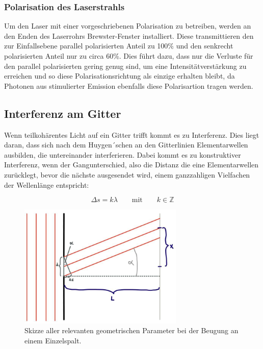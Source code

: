         \subsubsection{Polarisation des Laserstrahls}
            Um den Laser mit einer vorgeschriebenen Polarisation zu betreiben, werden an den Enden des Laserrohrs Brewster-Fenster installiert. Diese transmittieren den zur Einfallsebene parallel polarisierten
            Anteil zu 100\% und den senkrecht polarisierten Anteil nur zu circa 60\%. Dies führt dazu, dass nur die Verluste für den parallel polarisierten gering genug sind, um eine Intensitätverstärkung zu 
            erreichen und so diese Polarisationsrichtung als einzige erhalten bleibt, da Photonen aus stimulierter Emission ebenfalls diese Polarisartion tragen werden.  


    \subsection{Interferenz am Gitter}
        Wenn teilkohärentes Licht auf ein Gitter trifft kommt es zu Interferenz. Dies liegt daran, dass sich nach dem Huygen´schen an den Gitterlinien Elementarwellen ausbilden, die untereinander interferieren.
        Dabei kommt es zu konstruktiver Interferenz, wenn der Gangunterschied, also die Distanz die eine Elementarwellen zurücklegt, bevor die nächste ausgesendet wird, einem ganzzahligen Vielfachen der 
        Wellenlänge entspricht:

        \begin{equation}
            \Delta s = k \lambda \qquad \text{mit} \qquad k \in \mathds{Z}
            \label{eqn:gangunterschied}
        \end{equation}

        \begin{figure}[h]
            \centering
            \includegraphics[width = 0.7\textwidth]{pictures/spalt.jpg}
            \caption{Skizze aller relevanten geometrischen Parameter bei der Beugung an einem Einzelspalt.}
            \label{fig:Spalt}
        \end{figure}

